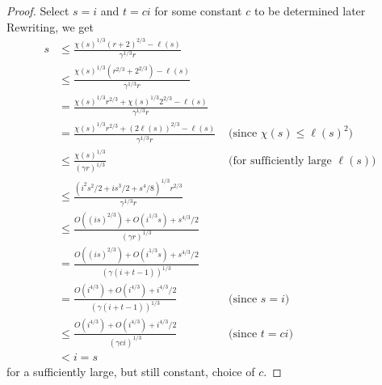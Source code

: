 \documentclass[12pt]{article}
\begin{document}
\begin{proof}
Select $s=i$ and $t=ci$ for some constant $c$ to be determined later
Rewriting, we get
\[
  \begin{aligned}
  s 
   &\le \frac{\chi(s)^{1/3} (r+2)^{2/3} - \ell(s)}{\gamma^{1/3}r} \\ 
   &\le \frac{\chi(s)^{1/3} (r^{2/3}+2^{2/3}) - \ell(s)}{\gamma^{1/3} r} \\
   & = \frac{\chi(s)^{1/3}r^{2/3}+\chi(s)^{1/3}2^{2/3} - \ell(s)}{\gamma^{1/3} r}  \\
   & = \frac{\chi(s)^{1/3}r^{2/3}+(2\ell(s))^{2/3} - \ell(s)}{\gamma^{1/3} r} 
    & \mbox{ (since $\chi(s) \le \ell(s)^2$)} \\
   &\le \frac{\chi(s)^{1/3}}{(\gamma r)^{1/3}}
    & \mbox{ (for sufficiently large $\ell(s)$)} \\
   &\le \frac{(i^2s^2/2 + is^3/2 + s^4/8)^{1/3}r^{2/3}}{\gamma^{1/3} r}  \\
   &\le \frac{O((is)^{2/3}) + O(i^{1/3}s) + s^{4/3}/2}{(\gamma r)^{1/3}}  \\
   & = \frac{O((is)^{2/3}) + O(i^{1/3}s) + s^{4/3}/2}{(\gamma (i+t-1))^{1/3}}  \\
   & = \frac{O(i^{4/3}) + O(i^{4/3}) + i^{4/3}/2}{(\gamma (i+t-1))^{1/3}}  
    & \mbox{ (since $s=i$)} \\
   & \le \frac{O(i^{4/3}) + O(i^{4/3}) + i^{4/3}/2}{(\gamma ci)^{1/3}}  
    & \mbox{ (since $t=ci$)} \\
   & < i = s
  \end{aligned}
\]
for a sufficiently large, but still constant, choice of $c$.
\end{proof}
\end{document}

